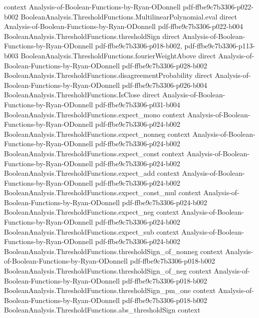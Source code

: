 \begin{theorem}
  {context}
  {Analysis-of-Boolean-Functions-by-Ryan-ODonnell}
  {pdf-ffbe9c7b3306-p022-b002}
\proofstep
  {BooleanAnalysis.ThresholdFunctions.MultilinearPolynomial.eval}
  {direct}
  {Analysis-of-Boolean-Functions-by-Ryan-ODonnell}
  {pdf-ffbe9c7b3306-p022-b004}
\proofstep
  {BooleanAnalysis.ThresholdFunctions.thresholdSign}
  {direct}
  {Analysis-of-Boolean-Functions-by-Ryan-ODonnell}
  {pdf-ffbe9c7b3306-p018-b002,
    pdf-ffbe9c7b3306-p113-b003}
\proofstep
  {BooleanAnalysis.ThresholdFunctions.fourierWeightAbove}
  {direct}
  {Analysis-of-Boolean-Functions-by-Ryan-ODonnell}
  {pdf-ffbe9c7b3306-p028-b002}
\proofstep
  {BooleanAnalysis.ThresholdFunctions.disagreementProbability}
  {direct}
  {Analysis-of-Boolean-Functions-by-Ryan-ODonnell}
  {pdf-ffbe9c7b3306-p026-b004}
\proofstep
  {BooleanAnalysis.ThresholdFunctions.IsClose}
  {direct}
  {Analysis-of-Boolean-Functions-by-Ryan-ODonnell}
  {pdf-ffbe9c7b3306-p031-b004}
\proofstep
  {BooleanAnalysis.ThresholdFunctions.expect_mono}
  {context}
  {Analysis-of-Boolean-Functions-by-Ryan-ODonnell}
  {pdf-ffbe9c7b3306-p024-b002}
\proofstep
  {BooleanAnalysis.ThresholdFunctions.expect_nonneg}
  {context}
  {Analysis-of-Boolean-Functions-by-Ryan-ODonnell}
  {pdf-ffbe9c7b3306-p024-b002}
\proofstep
  {BooleanAnalysis.ThresholdFunctions.expect_const}
  {context}
  {Analysis-of-Boolean-Functions-by-Ryan-ODonnell}
  {pdf-ffbe9c7b3306-p024-b002}
\proofstep
  {BooleanAnalysis.ThresholdFunctions.expect_add}
  {context}
  {Analysis-of-Boolean-Functions-by-Ryan-ODonnell}
  {pdf-ffbe9c7b3306-p024-b002}
\proofstep
  {BooleanAnalysis.ThresholdFunctions.expect_const_mul}
  {context}
  {Analysis-of-Boolean-Functions-by-Ryan-ODonnell}
  {pdf-ffbe9c7b3306-p024-b002}
\proofstep
  {BooleanAnalysis.ThresholdFunctions.expect_neg}
  {context}
  {Analysis-of-Boolean-Functions-by-Ryan-ODonnell}
  {pdf-ffbe9c7b3306-p024-b002}
\proofstep
  {BooleanAnalysis.ThresholdFunctions.expect_sub}
  {context}
  {Analysis-of-Boolean-Functions-by-Ryan-ODonnell}
  {pdf-ffbe9c7b3306-p024-b002}
\proofstep
  {BooleanAnalysis.ThresholdFunctions.thresholdSign_of_nonneg}
  {context}
  {Analysis-of-Boolean-Functions-by-Ryan-ODonnell}
  {pdf-ffbe9c7b3306-p018-b002}
\proofstep
  {BooleanAnalysis.ThresholdFunctions.thresholdSign_of_neg}
  {context}
  {Analysis-of-Boolean-Functions-by-Ryan-ODonnell}
  {pdf-ffbe9c7b3306-p018-b002}
\proofstep
  {BooleanAnalysis.ThresholdFunctions.thresholdSign_pm_one}
  {context}
  {Analysis-of-Boolean-Functions-by-Ryan-ODonnell}
  {pdf-ffbe9c7b3306-p018-b002}
\proofstep
  {BooleanAnalysis.ThresholdFunctions.abs_thresholdSign}
  {context}

\end{theorem}
